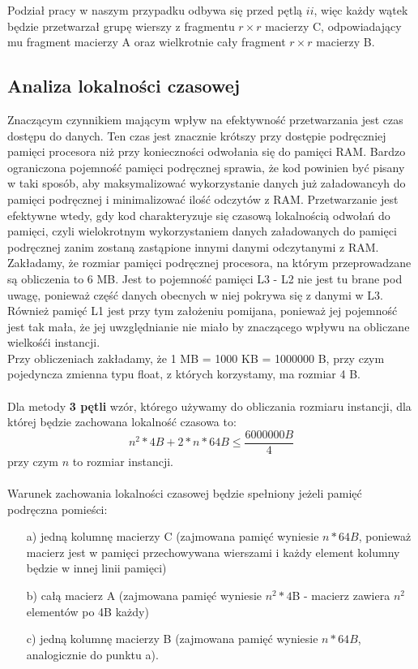 \documentclass[10pt,a4paper]{article}
\begin{document}
Podział pracy w naszym przypadku odbywa się przed pętlą $ii$, więc każdy wątek będzie przetwarzał grupę wierszy z fragmentu $r \times r$ macierzy C, 
odpowiadający mu fragment macierzy A oraz wielkrotnie cały fragment $r \times r$ macierzy B.

\newpage

\subsection{Analiza lokalności czasowej}
Znaczącym czynnikiem mającym wpływ na efektywność przetwarzania jest czas dostępu do
danych. Ten czas jest znacznie krótszy przy dostępie podręczniej pamięci procesora niż
przy konieczności odwołania się do pamięci RAM. Bardzo ograniczona pojemność pamięci
podręcznej sprawia, że kod powinien być pisany w taki sposób, aby maksymalizować
wykorzystanie danych już załadowancyh do pamięci podręcznej i minimalizować ilość
odczytów z RAM. Przetwarzanie jest efektywne wtedy, gdy kod charakteryzuje się
czasową lokalnością odwołań do pamięci, czyli wielokrotnym wykorzystaniem danych załadowanych
do pamięci podręcznej zanim zostaną zastąpione innymi danymi odczytanymi z RAM.\\
Zakładamy, że rozmiar pamięci podręcznej procesora, na którym przeprowadzane są
obliczenia to 6 MB. Jest to pojemność pamięci L3 - L2 nie jest tu brane pod uwagę,
ponieważ część danych obecnych w niej pokrywa się z danymi w L3. Również pamięć L1
jest przy tym założeniu pomijana, ponieważ jej pojemność jest tak mała, że jej uwzględnianie
nie miało by znaczącego wpływu na obliczane wielkośći instancji.\\
Przy obliczeniach zakładamy, że 1 MB = 1000 KB = 1000000 B, przy czym pojedyncza zmienna typu
float, z których korzystamy, ma rozmiar 4 B.\\
\\
Dla metody \textbf{3 pętli} wzór, którego używamy do obliczania rozmiaru instancji, dla której
będzie zachowana lokalność czasowa to:
\begin{equation}
	n^2 * 4B + 2 * n * 64B \leq \frac{6000000B}{4}
\end{equation}
przy czym $n$ to rozmiar instancji.\\\\
Warunek zachowania lokalności czasowej będzie spełniony jeżeli pamięć podręczna pomieści:
\begin{enumerate} \itemsep0pt
	\item[a)] jedną kolumnę macierzy C (zajmowana pamięć wyniesie $n * 64B$, ponieważ macierz jest w pamięci 
	      przechowywana wierszami i każdy element kolumny będzie w innej linii pamięci)
	\item[b)] całą macierz A (zajmowana pamięć wyniesie $n^2 * 4$B - macierz zawiera $n^2$ elementów po 4B każdy)
	\item[c)] jedną kolumnę macierzy B (zajmowana pamięć wyniesie $n * 64B$, analogicznie do punktu a).
\end{enumerate}
\end{document}
